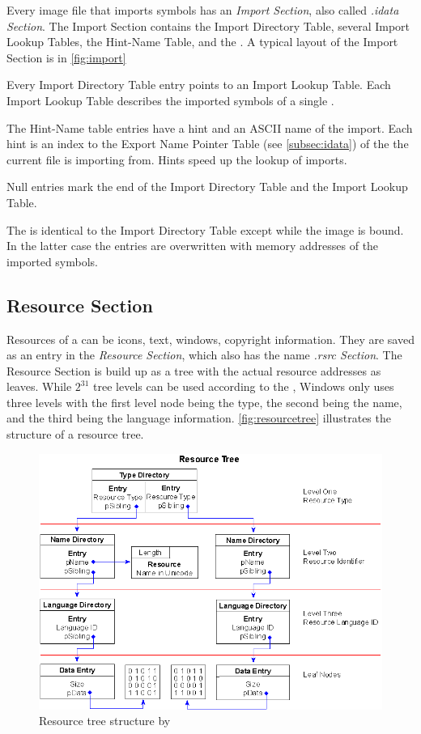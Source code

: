 Every image file that imports symbols has an \emph{Import Section}, also called \emph{.idata Section}.
The Import Section contains the Import Directory Table, several Import Lookup Tables, the Hint-Name Table, and the \IAT{}. A typical layout of the Import Section is in \autoref{fig:import}

Every Import Directory Table entry points to an Import Lookup Table. Each Import Lookup Table describes the imported symbols of a single \DLL{}.

The Hint-Name table entries have a hint and an ASCII name of the import. Each hint is an index to the Export Name Pointer Table (see \autoref{subsec:idata}) of the \DLL{} the current file is importing from. Hints speed up the lookup of imports.

Null entries mark the end of the Import Directory Table and the Import Lookup Table.

The \IAT{} is identical to the Import Directory Table except while the image is bound. In the latter case the \IAT{} entries are overwritten with memory addresses of the imported symbols.

\subsection*{Resource Section}

Resources of a \PE{} can be \ia{} icons, text, windows, copyright information. They are saved as an entry in the \emph{Resource Section}, which also has the name \emph{.rsrc Section}. The Resource Section is build up as a tree with the actual resource addresses as leaves. While \(2^{31}\) tree levels can be used according to the \PECOFF{} \cite[]{pespec}, Windows only uses three levels with the first level node being the type, the second being the name, and the third being the language information. \autoref{fig:resourcetree} illustrates the structure of a resource tree.

\begin{figure}
\includegraphics[width=.98\textwidth, height=\textheight,keepaspectratio]{graphics/resourcetree}
\caption{ Resource tree structure by }
\label{fig:resourcetree} 
\end{figure}

